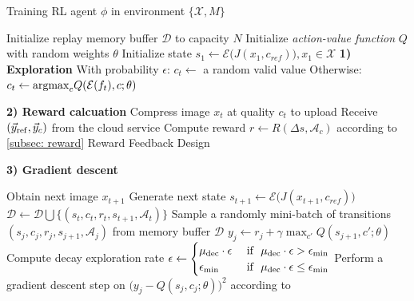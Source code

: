 \begin{algorithm}[!t]
{\color{revise2}
	\caption{Training RL agent $ \phi $ in environment $ \{\mathcal{X}, M\} $}
	\label{alg: rl-train}
	\begin{algorithmic}[1]
		\STATE Initialize replay memory buffer $ \mathcal{D} $ to capacity $ N $
		\STATE Initialize \emph{action-value function} $ Q $ with random weights $ \theta $
		{\color{revise2}
		\STATE Initialize state $ s_1 \leftarrow \mathcal{E}\big(J(x_1, c_{ref})\big), x_1 \in \mathcal{X} $ }
		\STATE \textbf{1) Exploration}
		\STATE With probability $\epsilon$:
		\STATE \hspace{1em} $c_t \leftarrow$ a random valid value 
		\STATE Otherwise:
		{\color{revise2}
		\STATE \hspace{1em} $ c_t \leftarrow {\rm argmax}_cQ(\mathcal{E}(f_t), c; \theta) $ }
		\STATE
		
		\STATE \textbf{2) Reward calcuation} 
		\STATE Compress image $ x_t $ at quality $ c_t $ to upload
		\STATE Receive $ (\vec{y}_{\rm ref}, \vec{y}_c) $ from the cloud service
		{\color{revise2} \STATE Compute reward $ r \leftarrow R(\Delta s, \mathcal{A}_c) $ according to \ref{subsec: reward} Reward Feedback Design}
		
		\STATE 
		\STATE \textbf{3) Gradient descent}
		{\color{revise2}\STATE Obtain next image $ x_{t+1} $
		\STATE Generate next state $ s_{t+1} \leftarrow \mathcal{E}\big(J(x_{t+1},c_{ref})\big) $
		\STATE $ \mathcal{D} \leftarrow \mathcal{D} \bigcup \{(s_t, c_t, r_t, s_{t+1},\mathcal{A}_t ) \} $
		\STATE Sample a randomly mini-batch of transitions $ (s_j, c_j, r_j, s_{j+1},\mathcal{A}_j ) $ from memory buffer $ \mathcal{D} $
		\STATE $ y_j \leftarrow r_j + \gamma \max_{c'}Q(s_{j+1}, c'; \theta) $
		\STATE Compute decay exploration rate 
		$ \epsilon \leftarrow 
		\begin{cases}
		\mu_{\rm dec}\cdot \epsilon & \text{ if } \ \mu_{\rm dec}\cdot \epsilon > \epsilon_{\min} \\ 
		\epsilon_{\min}             & \text{ if } \ \mu_{\rm dec}\cdot \epsilon \leq \epsilon_{\min}
		\end{cases} $
		\STATE Perform a gradient descent step on $ \big(y_j - Q(s_j, c_j; \theta)\big)^2 $ according to~\cite{DQN}
		
}
\end{algorithmic}}
\end{algorithm}

